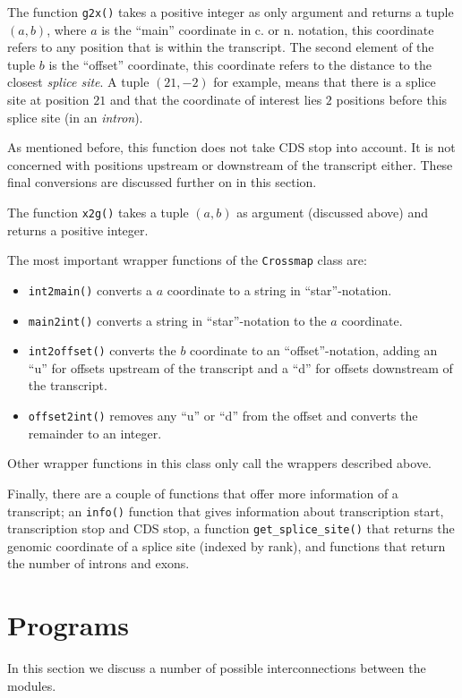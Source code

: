 \documentclass{article}
\begin{document}

The function \texttt{g2x()} takes a positive integer as only argument and
returns a tuple $(a, b)$, where $a$ is the ``main'' coordinate in c. or n.
notation, this coordinate refers to any position that is within the transcript.
The second element of the tuple $b$ is the ``offset'' coordinate, this
coordinate refers to the distance to the closest \emph{splice site}. A tuple
$(21, -2)$ for example, means that there is a splice site at position $21$ and
that the coordinate of interest lies $2$ positions before this splice site (in
an \emph{intron}).

As mentioned before, this function does not take CDS stop into account. It is
not concerned with positions upstream or downstream of the transcript either.
These final conversions are discussed further on in this section.

The function \texttt{x2g()} takes a tuple $(a, b)$ as argument (discussed
above) and returns a positive integer.

The most important wrapper functions of the \texttt{Crossmap} class are:
\begin{itemize}
\item \texttt{int2main()} converts a $a$ coordinate to a string in
      ``star''-notation.
\item \texttt{main2int()} converts a string in ``star''-notation to the $a$
      coordinate.
\item \texttt{int2offset()} converts the $b$ coordinate to an
      ``offset''-notation, adding an ``u'' for offsets upstream of the
      transcript and a ``d'' for offsets downstream of the transcript.
\item \texttt{offset2int()} removes any ``u'' or ``d'' from the offset and
      converts the remainder to an integer.
\end{itemize}

Other wrapper functions in this class only call the wrappers described above.

Finally, there are a couple of functions that offer more information of a
transcript; an \texttt{info()} function that gives information about
transcription start, transcription stop and CDS stop, a function
\texttt{get\_splice\_site()} that returns the genomic coordinate of a splice
site (indexed by rank), and functions that return the number of introns and
exons.

\newpage

\section{Programs} \label{sec:programs}
In this section we discuss a number of possible interconnections between the
modules.
\end{document}
